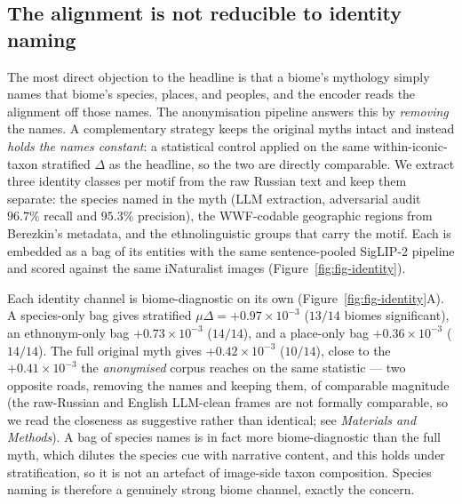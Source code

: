 \documentclass[11pt,a4paper]{article}
\begin{document}
\subsection*{The alignment is not reducible to identity naming}

The most direct objection to the headline is that a biome's
mythology simply names that biome's species, places, and peoples,
and the encoder reads the alignment off those names. The
anonymisation pipeline answers this by \emph{removing} the names.
A complementary strategy keeps the original myths intact and
instead \emph{holds the names constant}: a statistical control
applied on the same within-iconic-taxon stratified $\Delta$ as the
headline, so the two are directly comparable. We extract three identity classes per
motif from the raw Russian text and keep them separate: the species
named in the myth (LLM extraction, adversarial audit $96.7\%$
recall and $95.3\%$ precision), the WWF-codable geographic regions
from Berezkin's metadata, and the ethnolinguistic groups that carry
the motif. Each is embedded as a bag of its entities with the same
sentence-pooled SigLIP-2 pipeline and scored against the same
iNaturalist images (Figure~\ref{fig:fig-identity}).

Each identity channel is biome-diagnostic on its own
(Figure~\ref{fig:fig-identity}A). A species-only bag gives
stratified $\mu\Delta = +0.97\times 10^{-3}$ ($13/14$ biomes
significant), an ethnonym-only bag $+0.73\times 10^{-3}$ ($14/14$),
and a place-only bag $+0.36\times 10^{-3}$ ($14/14$). The full
original myth gives $+0.42\times 10^{-3}$ ($10/14$), close to the
$+0.41\times 10^{-3}$ the \emph{anonymised} corpus reaches on the
same statistic --- two opposite roads, removing the names and
keeping them, of comparable magnitude (the raw-Russian and
English LLM-clean frames are not formally comparable, so we read
the closeness as suggestive rather than identical; see
\emph{Materials and Methods}). A bag of
species names is in fact more biome-diagnostic than the full myth,
which dilutes the species cue with narrative content, and this
holds under stratification, so it is not an artefact of image-side
taxon composition. Species naming is therefore a genuinely strong
biome channel, exactly the concern.
\end{document}

